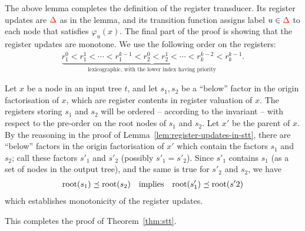The above lemma completes the definition of the register transducer. Its register updates are ${\color{red}{\Delta}}$ as in the lemma, and its transition function assigns label $u \in {\color{red}{\Delta}}$ to each node that satisfies $\varphi_u(x)$. The final part of the proof is showing that the register updates are monotone. We use the  following order on the registers:
\begin{align*}
\underbrace{r_1^0 < r_1^1 < \cdots < r_1^{k-1} < r_2^0 < r_2^1 < \cdots < r_k^{k-2} < r_k^{k-1}}_{\text{lexicographic, with the lower index having priority}}.
\end{align*}

Let $x$ be a node in an input tree $t$, and let $s_1,s_2$ be a ``below'' factor in the origin factorisation of $x$, which are register contents in register valuation of $x$. The registers storing $s_1$ and $s_2$ will be ordered -- according to the invariant -- with respect to the pre-order on the root nodes of $s_1$ and $s_2$. Let $x'$ be the parent of $x$. By the reasoning in the proof of Lemma~\ref{lem:register-updates-in-stt}, there are ``below'' factors in the origin factorisation of $x'$ which contain the factors $s_1$ and $s_2$; call these factors  $s'_1$ and $s'_2$ (possibly $s'_1=s'_2$). Since $s'_1$ contains $s_1$ (as a set of nodes in the output tree), and the same is true for $s'_2$ and $s_2$, we have 
\begin{align*}
\mathrm{root}(s_1) \preceq \mathrm{root}(s_2) \quad \text{implies} \quad \mathrm{root}(s'_1) \preceq \mathrm{root}(s'2)
\end{align*}
which establishes monotonicity of the register updates. 

This completes the proof of Theorem~\ref{thm:stt}.